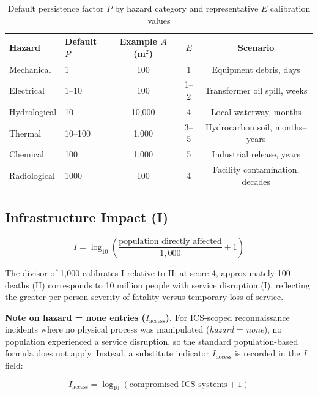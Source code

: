 \documentclass[11pt]{article}
\begin{document}
\begin{table}[htbp]
\centering
\caption{Default persistence factor $P$ by hazard category and
         representative $E$ calibration values}
\label{tab:P_hazard}
\begin{tabular}{llccc}
\toprule
Hazard & Default $P$ & Example $A$ (m$^2$) & $E$ & Scenario \\
\midrule
Mechanical   & 1    & 100       & 1 & Equipment debris, days \\
Electrical   & 1--10 & 100      & 1--2 & Transformer oil spill, weeks \\
Hydrological & 10   & 10{,}000  & 4 & Local waterway, months \\
Thermal      & 10--100 & 1{,}000 & 3--5 & Hydrocarbon soil, months--years \\
Chemical     & 100  & 1{,}000   & 5 & Industrial release, years \\
Radiological & 1000 & 100       & 4 & Facility contamination, decades \\
\bottomrule
\end{tabular}
\end{table}

\subsection{Infrastructure Impact (I)}
\label{sec:I}

\begin{equation}
  I = \log_{10}\!\left(\frac{\text{population directly affected}}{1{,}000} + 1\right)
  \label{eq:I}
\end{equation}

The divisor of 1,000 calibrates I relative to H: at score 4,
approximately 100 deaths (H) corresponds to 10 million people
with service disruption (I), reflecting the greater per-person
severity of fatality versus temporary loss of service.

\noindent\textbf{Note on hazard = none entries ($I_\text{access}$).}
For ICS-scoped reconnaissance incidents where no physical process
was manipulated (\textit{hazard} = \textit{none}), no population
experienced a service disruption, so the standard population-based
formula does not apply. Instead, a substitute indicator
$I_\text{access}$ is recorded in the \textit{I} field:

\begin{equation}
  I_\text{access} = \log_{10}(\text{compromised ICS systems} + 1)
  \label{eq:I_access}
\end{equation}
\end{document}
